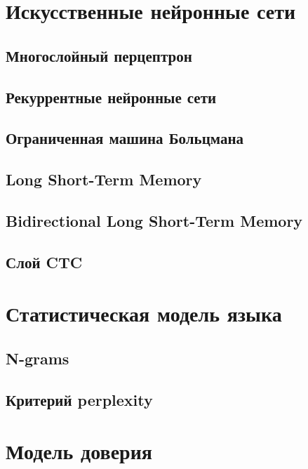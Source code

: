 \section{Искусственные нейронные сети}
\cite{tay2002offline}

\subsection{Многослойный перцептрон}
\subsection{Рекуррентные нейронные сети}
\subsection{Ограниченная машина Больцмана}
\subsection{Long Short-Term Memory}
\cite{hochreiter1997long}

\subsection{Bidirectional Long Short-Term Memory}
\subsection{Слой CTC}
\cite{graves2009novel, graves2006connectionist}


\section{Статистическая модель языка}
\subsection{N-grams}
\subsection{Критерий perplexity}
\cite{fischer2012handwriting, romero2012multimodal}

\section{Модель доверия}
\cite{fischer2012handwriting}


